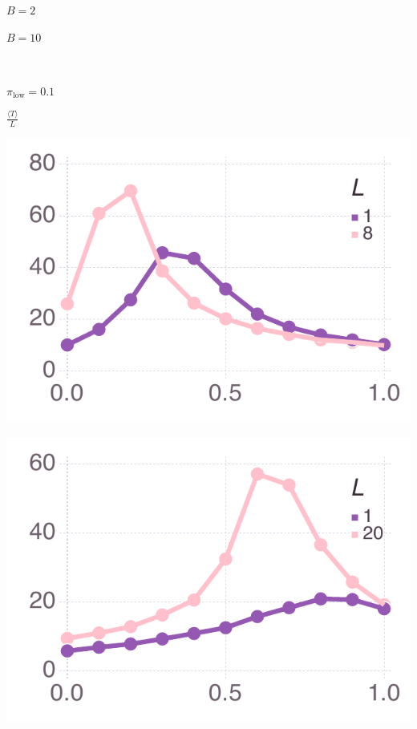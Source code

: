 \documentclass[varwidth=true,crop=false]{standalone}
\newcommand{\pisub}[1]{\pi_{\mathrm{#1}}}
\newcommand{\pilow}{\pisub{low}}
\newcommand{\meanvar}[1]{\langle #1 \rangle}
\newcommand{\meanT}{\meanvar{T}}
\begin{document}
    \begin{minipage}{3.75in}
      \centering
      {\hspace{5.25em}\huge $B = 2$}
    \end{minipage}%
    \begin{minipage}{3.75in}
      \centering
      {\hspace{2.0em}\huge $B = 10$}
    \end{minipage}~\\

    \begin{minipage}{3.75in}
    \begin{rotate}{90}
      {\parbox{2.5in}{
          \centering
          \vspace{-2.5em} {\huge$ \pilow = 0.1$} \\
          {\begin{rotate}{-90}{\huge $\frac{\meanT}{L}$}\hspace{3em}\end{rotate}}
      }}
    \end{rotate}%
    \hspace{2em}
      \includegraphics[width=\textwidth]{Figures/step_over_u_lowpayoff=0.1_nbehaviors=2.pdf}
    \end{minipage}\noindent\begin{minipage}{3.75in}%
      \includegraphics[width=\textwidth]{Figures/step_over_u_lowpayoff=0.1_nbehaviors=10.pdf}
    \end{minipage}~\\[0.5em]
\end{document}

